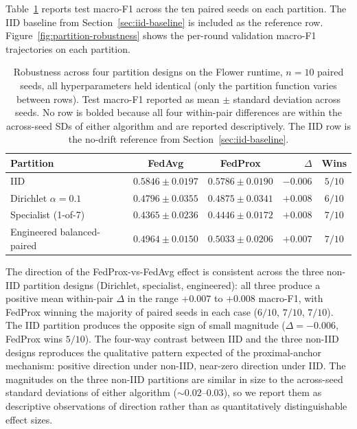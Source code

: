 \documentclass[11pt,a4paper]{report}
\begin{document}
Table~\ref{tab:partition-robustness} reports test macro-F1
across the ten paired seeds on each partition. The IID baseline
from Section~\ref{sec:iid-baseline} is included as the reference
row. Figure~\ref{fig:partition-robustness} shows the per-round
validation macro-F1 trajectories on each partition.

\begin{table}[!htbp]
\centering
\caption{Robustness across four partition designs on the
Flower runtime, $n = 10$ paired seeds, all hyperparameters
held identical (only the partition function varies between
rows). Test macro-F1 reported as mean $\pm$ standard deviation
across seeds. No row is bolded because all four within-pair
differences are within the across-seed SDs of either algorithm
and are reported descriptively. The IID row is the no-drift
reference from Section~\ref{sec:iid-baseline}.}
\label{tab:partition-robustness}
\small
\setlength{\tabcolsep}{5pt}
\renewcommand{\arraystretch}{1.15}
\begin{tabular}{@{}l c c r c@{}}
\toprule
Partition                  & FedAvg              & FedProx             & $\Delta$ & Wins   \\
\midrule
IID                        & $0.5846 \pm 0.0197$ & $0.5786 \pm 0.0190$ & $-0.006$ & $5/10$ \\
Dirichlet $\alpha = 0.1$   & $0.4796 \pm 0.0355$ & $0.4875 \pm 0.0341$ & $+0.008$ & $6/10$ \\
Specialist (1-of-7)        & $0.4365 \pm 0.0236$ & $0.4446 \pm 0.0172$ & $+0.008$ & $7/10$ \\
Engineered balanced-paired & $0.4964 \pm 0.0150$ & $0.5033 \pm 0.0206$ & $+0.007$ & $7/10$ \\
\bottomrule
\end{tabular}
\end{table}

The direction of the FedProx-vs-FedAvg effect is consistent
across the three non-IID partition designs (Dirichlet,
specialist, engineered): all three produce a positive mean
within-pair $\Delta$ in the range $+0.007$ to $+0.008$ macro-F1,
with FedProx winning the majority of paired seeds in each case
($6/10$, $7/10$, $7/10$). The IID partition produces the
opposite sign of small magnitude ($\Delta = -0.006$, FedProx
wins $5/10$). The four-way contrast between IID and the three
non-IID designs reproduces the qualitative pattern expected of
the proximal-anchor mechanism: positive direction under
non-IID, near-zero direction under IID. The magnitudes on
the three non-IID partitions are similar in size to the
across-seed standard deviations of either algorithm
($\sim 0.02$--$0.03$), so we report them as descriptive
observations of direction rather than as quantitatively
distinguishable effect sizes.
\end{document}
